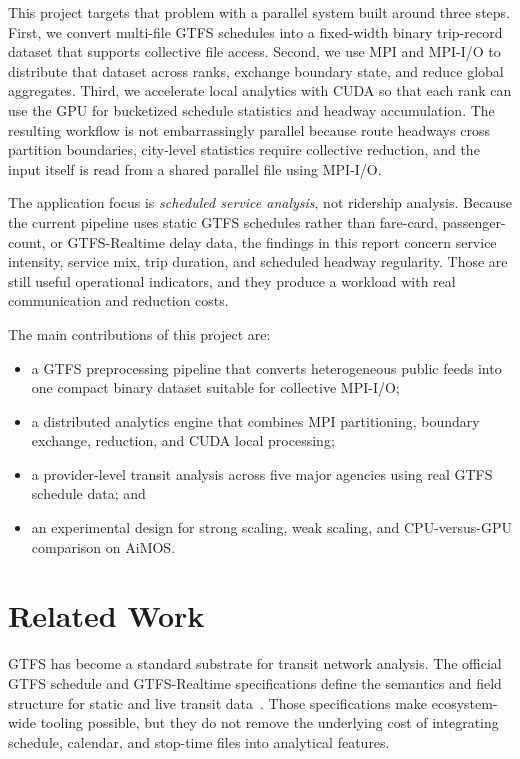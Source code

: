 \documentclass[sigconf,nonacm]{acmart}
\begin{document}
This project targets that problem with a parallel system built around three steps. First, we convert multi-file GTFS schedules into a fixed-width binary trip-record dataset that supports collective file access. Second, we use MPI and MPI-I/O to distribute that dataset across ranks, exchange boundary state, and reduce global aggregates. Third, we accelerate local analytics with CUDA so that each rank can use the GPU for bucketized schedule statistics and headway accumulation. The resulting workflow is not embarrassingly parallel because route headways cross partition boundaries, city-level statistics require collective reduction, and the input itself is read from a shared parallel file using MPI-I/O.

The application focus is \emph{scheduled service analysis}, not ridership analysis. Because the current pipeline uses static GTFS schedules rather than fare-card, passenger-count, or GTFS-Realtime delay data, the findings in this report concern service intensity, service mix, trip duration, and scheduled headway regularity. Those are still useful operational indicators, and they produce a workload with real communication and reduction costs.

The main contributions of this project are:
\begin{itemize}[leftmargin=*]
  \item a GTFS preprocessing pipeline that converts heterogeneous public feeds into one compact binary dataset suitable for collective MPI-I/O;
  \item a distributed analytics engine that combines MPI partitioning, boundary exchange, reduction, and CUDA local processing;
  \item a provider-level transit analysis across five major agencies using real GTFS schedule data; and
  \item an experimental design for strong scaling, weak scaling, and CPU-versus-GPU comparison on AiMOS.
\end{itemize}

\section{Related Work}
GTFS has become a standard substrate for transit network analysis. The official GTFS schedule and GTFS-Realtime specifications define the semantics and field structure for static and live transit data~\cite{gtfs_schedule_ref,gtfs_realtime_ref,gtfs_overview}. Those specifications make ecosystem-wide tooling possible, but they do not remove the underlying cost of integrating schedule, calendar, and stop-time files into analytical features.
\end{document}
